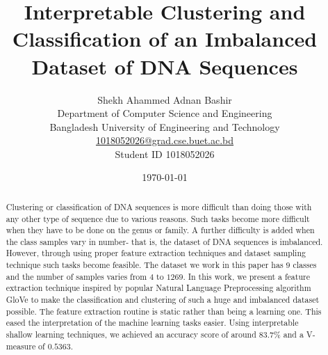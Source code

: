 \documentclass[oneside, twocolumn, a4paper, 10pt]{IEEEtran}
\begin{document}
\title{Interpretable Clustering and Classification of an Imbalanced Dataset of DNA Sequences}
\author{Shekh Ahammed Adnan Bashir \\ Department of Computer Science and Engineering \\ Bangladesh University of Engineering and Technology \\ \url{1018052026@grad.cse.buet.ac.bd} \\ Student ID 1018052026}
\date{\today}
\maketitle

\begin{abstract}
Clustering or classification of DNA sequences is more difficult than doing those with any other type of sequence due to various reasons. Such tasks become more difficult when they have to be done on the genus or family. A further difficulty is added when the class samples vary in number- that is, the dataset of DNA sequences is imbalanced. However, through using proper feature extraction techniques and dataset sampling technique such tasks become feasible. The dataset we work in this paper has $9$ classes and the number of samples varies from $4$ to $1269$. In this work, we present a feature extraction technique inspired by popular Natural Language Preprocessing algorithm GloVe \cite{1} to make the classification and clustering of such a huge and imbalanced dataset possible. The feature extraction routine is static rather than being a learning one. This eased the interpretation of the machine learning tasks easier. Using interpretable shallow learning techniques, we achieved an accuracy score of around $83.7$\% and a V-measure of $0.5363$.
\end{abstract}
\end{document}
